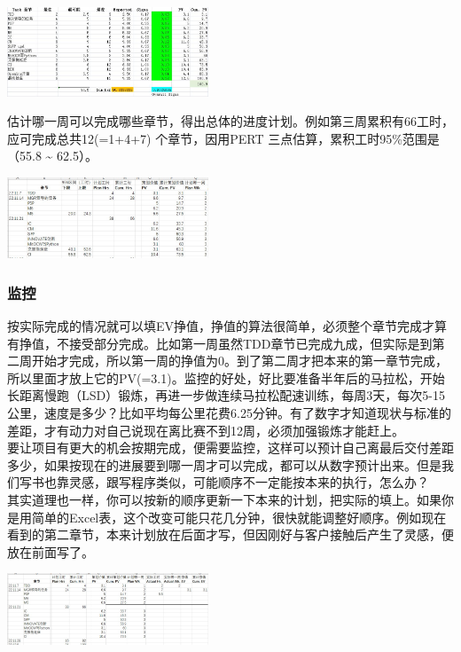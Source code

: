 \includegraphics[width=6cm]{psp11.jpg}

估计哪一周可以完成哪些章节，得出总体的进度计划。例如第三周累积有66工时，应可完成总共12(=1+4+7)
个章节，因用PERT 三点估算，累积工时95\%范围是（55.8 \textasciitilde{}
62.5）。


\includegraphics[width=6cm]{PSP3wksPlanScreenshot_2022-11-26_085813.jpg}

\hypertarget{ux76d1ux63a7}{%
\subsubsection{监控}\label{ux76d1ux63a7}}

按实际完成的情况就可以填EV挣值，挣值的算法很简单，必须整个章节完成才算有挣值，不接受部分完成。比如第一周虽然TDD章节已完成九成，但实际是到第二周开始才完成，所以第一周的挣值为0。到了第二周才把本来的第一章节完成，所以里面才放上它的PV(=3.1)。监控的好处，好比要准备半年后的马拉松，开始长距离慢跑（LSD）锻炼，再进一步做连续马拉松配速训练，每周3天，每次5-15公里，速度是多少？比如平均每公里花费6.25分钟。有了数字才知道现状与标准的差距，才有动力对自己说现在离比赛不到12周，必须加强锻炼才能赶上。\\
要让项目有更大的机会按期完成，便需要监控，这样可以预计自己离最后交付差距多少，如果按现在的进展要到哪一周才可以完成，都可以从数字预计出来。但是我们写书也靠灵感，跟写程序类似，可能顺序不一定能按本来的执行，怎么办？\\
其实道理也一样，你可以按新的顺序更新一下本来的计划，把实际的填上。如果你是用简单的Excel表，这个改变可能只花几分钟，很快就能调整好顺序。例如现在看到的第二章节，本来计划放在后面才写，但因刚好与客户接触后产生了灵感，便放在前面写了。


\includegraphics[width=6cm]{PSPend2ndWkEvScreenshot_2022-11-26_091326.jpg}

